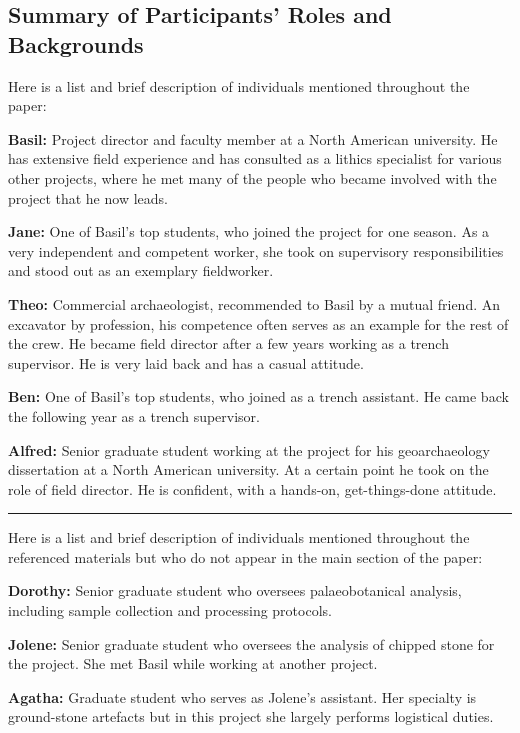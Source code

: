 \documentclass[
]{article}
\begin{document}
\subsection{Summary of Participants' Roles and
Backgrounds}\label{summary-of-participants-roles-and-backgrounds}

Here is a list and brief description of individuals mentioned throughout
the paper:

\textbf{Basil:} Project director and faculty member at a North American
university. He has extensive field experience and has consulted as a
lithics specialist for various other projects, where he met many of the
people who became involved with the project that he now leads.

\textbf{Jane:} One of Basil's top students, who joined the project for
one season. As a very independent and competent worker, she took on
supervisory responsibilities and stood out as an exemplary fieldworker.

\textbf{Theo:} Commercial archaeologist, recommended to Basil by a
mutual friend. An excavator by profession, his competence often serves
as an example for the rest of the crew. He became field director after a
few years working as a trench supervisor. He is very laid back and has a
casual attitude.

\textbf{Ben:} One of Basil's top students, who joined as a trench
assistant. He came back the following year as a trench supervisor.

\textbf{Alfred:} Senior graduate student working at the project for his
geoarchaeology dissertation at a North American university. At a certain
point he took on the role of field director. He is confident, with a
hands-on, get-things-done attitude.

\begin{center}\rule{0.5\linewidth}{0.5pt}\end{center}

Here is a list and brief description of individuals mentioned throughout
the referenced materials but who do not appear in the main section of
the paper:

\textbf{Dorothy:} Senior graduate student who oversees palaeobotanical
analysis, including sample collection and processing protocols.

\textbf{Jolene:} Senior graduate student who oversees the analysis of
chipped stone for the project. She met Basil while working at another
project.

\textbf{Agatha:} Graduate student who serves as Jolene's assistant. Her
specialty is ground-stone artefacts but in this project she largely
performs logistical duties.
\end{document}
